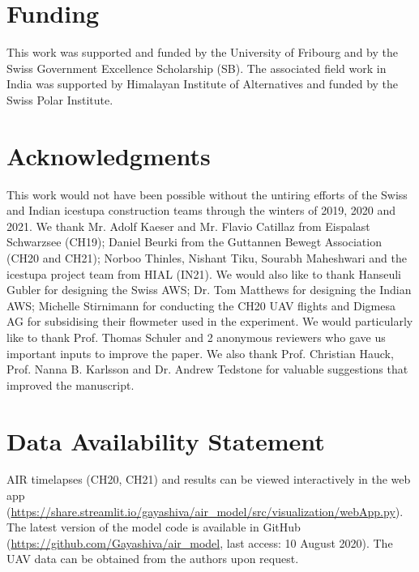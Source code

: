 \documentclass[utf8]{frontiersSCNS}
\begin{document}
\section*{Funding} This work was supported and funded by the University of Fribourg and by the Swiss Government
Excellence Scholarship (SB). The associated field work in India was supported by Himalayan Institute of
Alternatives and funded by the Swiss Polar Institute.

\section*{Acknowledgments} This work would not have been possible without the untiring efforts of the Swiss and
Indian icestupa construction teams through the winters of 2019, 2020 and 2021. We thank Mr. Adolf Kaeser and Mr.
Flavio Catillaz from Eispalast Schwarzsee (CH19); Daniel Beurki from the Guttannen Bewegt Association (CH20 and
CH21); Norboo Thinles, Nishant Tiku, Sourabh Maheshwari and the icestupa project team from HIAL (IN21).  We
would also like to thank Hanseuli Gubler for designing the Swiss AWS; Dr. Tom Matthews for designing the Indian
AWS; Michelle Stirnimann for conducting the CH20 UAV flights and Digmesa AG for subsidising their flowmeter
used in the experiment.  We would particularly like to thank Prof. Thomas Schuler and 2 anonymous reviewers who
gave us important inputs to improve the paper. We also thank Prof. Christian Hauck, Prof.  Nanna B. Karlsson and
Dr.  Andrew Tedstone for valuable suggestions that improved the manuscript.

\section*{Data Availability Statement} AIR timelapses (CH20, CH21) and results can be viewed interactively in
the web app (\url{https://share.streamlit.io/gayashiva/air_model/src/visualization/webApp.py}).  The latest version of
the model code is available in GitHub (\url{https://github.com/Gayashiva/air_model}, last access: 10 August 2020). The
UAV data can be obtained from the authors upon request.

 
\end{document}
